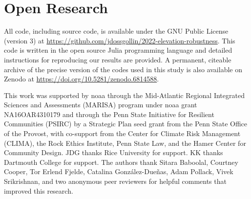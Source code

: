 \documentclass{agujournal2019}
\begin{document}
\section{Open Research}

All code, including source code, is available under the GNU Public License (version 3) at \url{https://github.com/jdossgollin/2022-elevation-robustness}.
This code is written in the open source Julia programming language and detailed instructions for reproducing our results are provided.
A permanent, citeable archive of the precise version of the codes used in this study is also available on Zenodo at \url{https://doi.org/10.5281/zenodo.6814588}.


\acknowledgments

This work was supported by \acrfull{noaa} through the Mid-Atlantic Regional Integrated Sciences and Assessments (MARISA) program under \gls{noaa} grant NA16OAR4310179 and through the Penn State Initiative for Resilient Communities (PSIRC) by a Strategic Plan seed grant from the Penn State Office of the Provost, with co-support from the Center for Climate Risk Management (CLIMA), the Rock Ethics Institute, Penn State Law, and the Hamer Center for Community Design.
JDG thanks Rice University for support.
KK thanks Dartmouth College for support.
The authors thank
Sitara Baboolal,
Courtney Cooper,
Tor Erlend Fjelde,
Catalina González-Dueñas,
Adam Pollack,
Vivek Srikrishnan,
and two anonymous peer reviewers
for helpful comments that improved this research.





\end{document}
